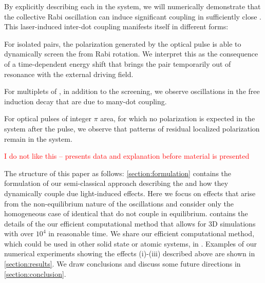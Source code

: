 By explicitly describing each \qd{} in the system, we will numerically demonstrate  that the collective Rabi oscillation can induce significant coupling in sufficiently close \qds{}.
This laser-induced inter-dot coupling manifests itself in different forms:
\begin{inparaenum}[(i)]
  \item For isolated \qd{} pairs, the polarization generated by the optical pulse is able to dynamically screen the \qds{} from Rabi rotation.
    We interpret this as the consequence of a time-dependent energy shift that brings the pair temporarily out of resonance with the external driving field.
  \item For multiplets of \qds{}, in addition to the screening, we observe oscillations in the free induction decay that are due to many-dot coupling.
  \item For optical pulses of integer $\pi$ area, for which no polarization is expected in the system after the pulse, we observe that patterns of residual localized polarization remain in the system.
\end{inparaenum}
\textcolor{red}{I do not like this -- presents data and explanation before material is presented}

The structure of this paper as follows: \cref{section:formulation} contains the formulation of our semi-classical approach describing the \qds{} and how they dynamically couple due light-induced effects.
Here we focus on effects that arise from the non-equilibrium nature of the oscillations and consider only the homogeneous case of identical \qds{} that do not couple in equilibrium.
 contains the details of the our efficient computational method that allows for 3D simulations with over $10^4$ \qds{} in reasonable time.
We share our efficient computational method, which could be used in other solid state or atomic systems, in \cite{githubpage}.
Examples of our numerical experiments showing the effects (i)-(iii) described above are shown in \cref{section:results}.
We draw conclusions and discuss some future directions in \cref{section:conclusion}.
